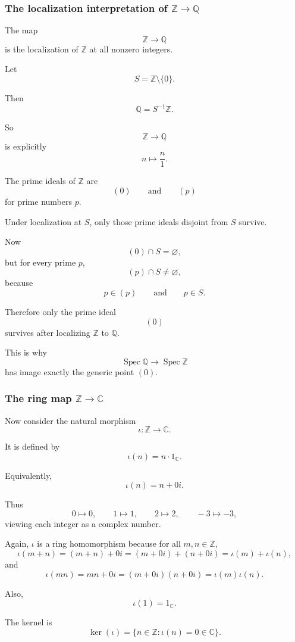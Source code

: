 \documentclass[12pt,a4paper]{article}
\DeclareMathOperator{\Spec}{Spec}
\theoremstyle{notespace}
\begin{document}
\subsubsection*{The localization interpretation of \texorpdfstring{\(\mathbb Z\to\mathbb Q\)}{Z to Q}}

The map
\[
\mathbb Z\to\mathbb Q
\]
is the localization of \(\mathbb Z\) at all nonzero integers.

Let
\[
S=\mathbb Z\setminus\{0\}.
\]

Then
\[
\mathbb Q=S^{-1}\mathbb Z.
\]

So
\[
\mathbb Z\to\mathbb Q
\]
is explicitly
\[
n\longmapsto \frac{n}{1}.
\]

The prime ideals of \(\mathbb Z\) are
\[
(0)
\qquad\text{and}\qquad
(p)
\]
for prime numbers \(p\).

Under localization at \(S\), only those prime ideals disjoint from \(S\) survive.

Now
\[
(0)\cap S=\varnothing,
\]
but for every prime \(p\),
\[
(p)\cap S\neq\varnothing,
\]
because
\[
p\in(p)
\qquad\text{and}\qquad
p\in S.
\]

Therefore only the prime ideal
\[
(0)
\]
survives after localizing \(\mathbb Z\) to \(\mathbb Q\).

This is why
\[
\Spec\mathbb Q\to\Spec\mathbb Z
\]
has image exactly the generic point \((0)\).

\subsubsection*{The ring map \texorpdfstring{\(\mathbb Z\to \mathbb C\)}{Z to C}}

Now consider the natural morphism
\[
\iota:\mathbb Z\longrightarrow \mathbb C.
\]

It is defined by
\[
\iota(n)=n\cdot 1_{\mathbb C}.
\]

Equivalently,
\[
\iota(n)=n+0i.
\]

Thus
\[
0\mapsto 0,
\qquad
1\mapsto 1,
\qquad
2\mapsto 2,
\qquad
-3\mapsto -3,
\]
viewing each integer as a complex number.

Again, \(\iota\) is a ring homomorphism because for all \(m,n\in\mathbb Z\),
\[
\iota(m+n)=(m+n)+0i
=
(m+0i)+(n+0i)
=
\iota(m)+\iota(n),
\]
and
\[
\iota(mn)=mn+0i
=
(m+0i)(n+0i)
=
\iota(m)\iota(n).
\]

Also,
\[
\iota(1)=1_{\mathbb C}.
\]

The kernel is
\[
\ker(\iota)=\{n\in\mathbb Z:\iota(n)=0\in\mathbb C\}.
\]
\end{document}
